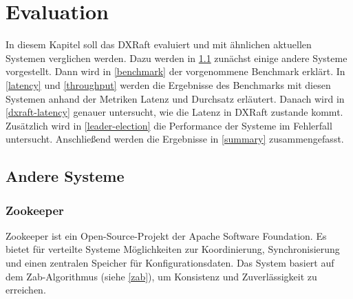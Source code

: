 \chapter{Evaluation}
\label{eval}

In diesem Kapitel soll das DXRaft evaluiert und mit ähnlichen aktuellen Systemen verglichen werden. Dazu werden in \ref{systems} zunächst einige andere Systeme vorgestellt. Dann wird in \ref{benchmark} der vorgenommene Benchmark erklärt. In \ref{latency} und \ref{throughput} werden die Ergebnisse des Benchmarks mit diesen Systemen anhand der Metriken Latenz und Durchsatz erläutert. Danach wird in \ref{dxraft-latency} genauer untersucht, wie die Latenz in DXRaft zustande kommt. Zusätzlich wird in \ref{leader-election} die Performance der Systeme im Fehlerfall untersucht. Anschließend werden die Ergebnisse in \ref{summary} zusammengefasst.

\section{Andere Systeme}
\label{systems}

\subsection{Zookeeper}

Zookeeper \cite{zookeeper} ist ein Open-Source-Projekt der Apache Software Foundation. Es bietet für verteilte Systeme Möglichkeiten zur Koordinierung, Synchronisierung und einen zentralen Speicher für Konfigurationsdaten. Das System basiert auf dem Zab-Algorithmus (siehe \ref{zab}), um Konsistenz und Zuverlässigkeit zu erreichen.

